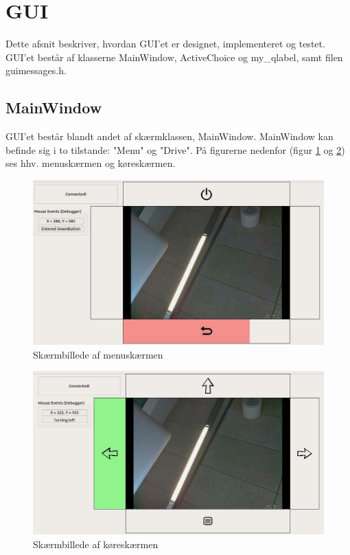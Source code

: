 %

%

\section{GUI}
Dette afsnit beskriver, hvordan GUI'et er designet, implementeret og testet.
GUI'et består af klasserne MainWindow, ActiveChoice og my\_qlabel, samt filen guimessages.h.

\subsection{MainWindow}
GUI'et består blandt andet af skærmklassen, MainWindow. 
MainWindow kan befinde sig i to tilstande: "Menu" og "Drive". 
På figurerne nedenfor (figur \ref{fig:Menuscreen} og \ref{fig:Drivescreen}) ses hhv. menuskærmen og køreskærmen.

\begin{figure} [H]
	\centering
	\includegraphics[width = \textwidth]{figur/Menuscreen.JPG}
	\caption{Skærmbillede af menuskærmen}
	\label{fig:Menuscreen}
\end{figure}

\begin{figure} [H]
	\centering
	\includegraphics[width = \textwidth]{figur/Drivescreen.JPG}
	\caption{Skærmbillede af køreskærmen}
	\label{fig:Drivescreen}
\end{figure}

